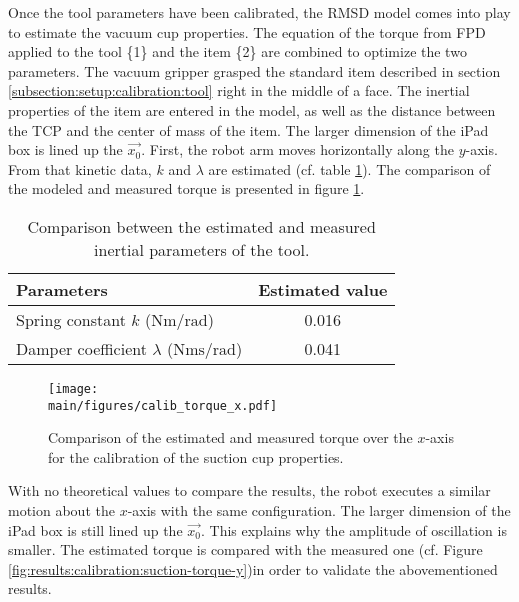 \documentclass[/home/francois/latex/report/main.tex]{subfiles}
\begin{document}
Once the tool parameters have been calibrated, the \ac{RMSD} model comes into play to estimate the vacuum cup properties. The equation of the torque from \ac{FPD} applied to the tool \{1\} and the item \{2\} are combined to optimize the two parameters. The vacuum gripper grasped the standard item described in section \ref{subsection:setup:calibration:tool} right in the middle of a face. The inertial properties of the item are entered in the model, as well as the distance between the \ac{TCP} and the center of mass of the item. The larger dimension of the iPad box is lined up the $\overrightarrow{x_0}$. First, the robot arm moves horizontally along the $y$-axis. From that kinetic data, $k$ and $\lambda$ are estimated (cf. table \ref{tab:results:calibration-cup}). The comparison of the modeled and measured torque is presented in figure \ref{fig:results:calibration:suction-torque-x}.

\begin{table}[h]
  \begin{center}
    \renewcommand{\arraystretch}{1.2} %
    \begin{tabular}{l|c} %
      \textbf{Parameters} & \textbf{Estimated value} \\
      \hline
      Spring constant $k$ ($\si{\newton\meter\per\radian}$) & 0.016\\
      \hline
      Damper coefficient $\lambda$ ($\si{\newton\meter\second\per\radian}$) & 0.041 \\
      \hline
    \end{tabular}
  \end{center}
  \caption{Comparison between the estimated and measured inertial parameters of the tool.\label{tab:results:calibration-cup}}
\end{table}

\begin{figure}[h]
  \centering
  \texttt{[image: \\main/figures/calib\_torque\_x.pdf]}
  \caption{Comparison of the estimated and measured torque over the $x$-axis for the calibration of the suction cup properties.}
  \label{fig:results:calibration:suction-torque-x}
\end{figure}

With no theoretical values to compare the results, the robot executes a similar motion about the $x$-axis with the same configuration. The larger dimension of the iPad box is still lined up the $\overrightarrow{x_0}$. This explains why the amplitude of oscillation is smaller. The estimated torque is compared with the measured one (cf. Figure \ref{fig:results:calibration:suction-torque-y})in order to validate the abovementioned results.
\end{document}
